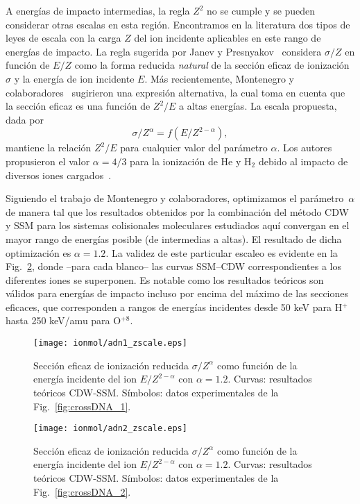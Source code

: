 A energías de impacto intermedias, la regla $Z^2$ no se cumple y se 
pueden considerar otras escalas en esta región. Encontramos en la 
literatura dos tipos de leyes de escala con la carga $Z$ del ion 
incidente aplicables en este rango de energías de impacto. La regla 
sugerida por Janev y Presnyakov~\cite{Janev:80} considera $\sigma/Z$ en 
función de $E/Z$ como la forma reducida \textit{natural} de la sección 
eficaz de ionización $\sigma$ y la energía de ion incidente $E$. Más 
recientemente, Montenegro y colaboradores~\cite{Dubois:13,Montenegro:13} 
sugirieron una expresión alternativa, la cual toma en cuenta que la 
sección eficaz es una función de $Z^2/E$ a altas energías. La escala 
propuesta, dada por
\begin{equation}
 \sigma/Z^{\alpha}=f(E/Z^{2-\alpha}),
\label{eq:Montenegro}
\end{equation}
mantiene la relación $Z^2/E$ para cualquier valor del parámetro $\alpha$. 
Los autores propusieron el valor $\alpha=4/3$ para la ionización de He y
H$_2$ debido al impacto de diversos iones cargados~\cite{Dubois:13}. 

Siguiendo el trabajo de Montenegro y colaboradores, optimizamos el 
parámetro~$\alpha$ de manera tal que los resultados obtenidos por la 
combinación del método CDW y SSM para los sistemas colisionales 
moleculares estudiados aquí convergan en el mayor rango de energías 
posible (de intermedias a altas). El resultado de dicha optimización es 
$\alpha=1.2$. La validez de este particular escaleo es evidente en la 
Fig.~\ref{fig:zreduced}, donde --para cada blanco-- las curvas SSM--CDW 
correspondientes a los diferentes iones se superponen. Es notable como 
los resultados teóricos son válidos para energías de impacto incluso por 
encima del máximo de las secciones eficaces, que corresponden a rangos de 
energías incidentes desde 50 keV para H$^+$ hasta 250 keV/amu para 
O$^{+8}$.

\begin{figure}
\centering
\texttt{[image: ionmol/adn1\_zscale.eps]}
\caption[Sección eficaz de ionización reducida por $Z$ y $\alpha$ 
(Parte I).]
{Sección eficaz de ionización reducida $\sigma/Z^{\alpha}$ como función
de la energía incidente del ion $E/Z^{2-\alpha}$ con $\alpha=1.2$. 
Curvas: resultados teóricos CDW-SSM. 
Símbolos: datos experimentales de la Fig.~\ref{fig:crossDNA_1}.}
\label{fig:zreduced}
\end{figure} 

\begin{figure}
\centering
\texttt{[image: ionmol/adn2\_zscale.eps]}
\caption[Sección eficaz de ionización reducida por $Z$ y $\alpha$ 
(Parte II).]
{Sección eficaz de ionización reducida $\sigma/Z^{\alpha}$ como función
de la energía incidente del ion $E/Z^{2-\alpha}$ con $\alpha=1.2$. 
Curvas: resultados teóricos CDW-SSM. 
Símbolos: datos experimentales de la Fig.~\ref{fig:crossDNA_2}.}
\label{fig:zreduced}
\end{figure} 


